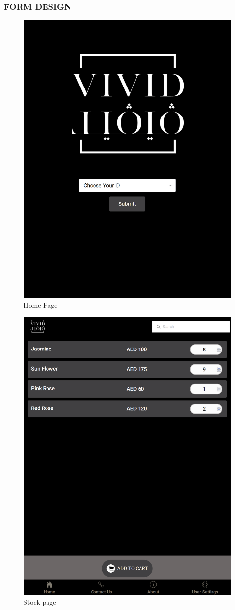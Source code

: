 \documentclass[a4paper,12pt]{article}
\begin{document}
\subsubsection{FORM DESIGN}
\begin{figure}[h!]
\centering
\includegraphics[height=1.1\textwidth]{a.PNG}
\caption{Home Page}
\end{figure}
\newpage
\begin{figure}[h!]
\centering\includegraphics[height=1.1\textwidth]{b.png}
\caption{Stock page}
\end{figure}
\end{document}
